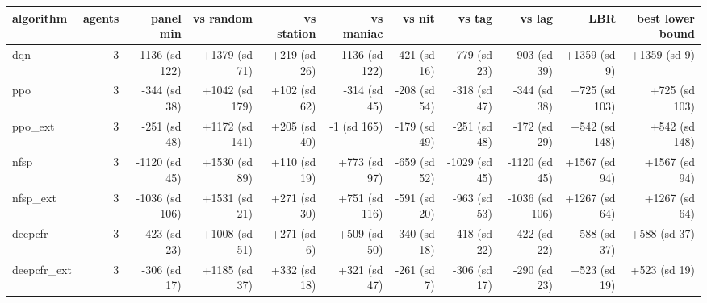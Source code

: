 \begin{tabular}{lrrrrrrrrrr}
\toprule
algorithm & agents & panel min & vs random & vs station & vs maniac & vs nit & vs tag & vs lag & LBR & best lower bound \\
\midrule
dqn & 3 & -1136 (sd 122) & +1379 (sd 71) & +219 (sd 26) & -1136 (sd 122) & -421 (sd 16) & -779 (sd 23) & -903 (sd 39) & +1359 (sd 9) & +1359 (sd 9) \\
ppo & 3 & -344 (sd 38) & +1042 (sd 179) & +102 (sd 62) & -314 (sd 45) & -208 (sd 54) & -318 (sd 47) & -344 (sd 38) & +725 (sd 103) & +725 (sd 103) \\
ppo\_ext & 3 & -251 (sd 48) & +1172 (sd 141) & +205 (sd 40) & -1 (sd 165) & -179 (sd 49) & -251 (sd 48) & -172 (sd 29) & +542 (sd 148) & +542 (sd 148) \\
nfsp & 3 & -1120 (sd 45) & +1530 (sd 89) & +110 (sd 19) & +773 (sd 97) & -659 (sd 52) & -1029 (sd 45) & -1120 (sd 45) & +1567 (sd 94) & +1567 (sd 94) \\
nfsp\_ext & 3 & -1036 (sd 106) & +1531 (sd 21) & +271 (sd 30) & +751 (sd 116) & -591 (sd 20) & -963 (sd 53) & -1036 (sd 106) & +1267 (sd 64) & +1267 (sd 64) \\
deepcfr & 3 & -423 (sd 23) & +1008 (sd 51) & +271 (sd 6) & +509 (sd 50) & -340 (sd 18) & -418 (sd 22) & -422 (sd 22) & +588 (sd 37) & +588 (sd 37) \\
deepcfr\_ext & 3 & -306 (sd 17) & +1185 (sd 37) & +332 (sd 18) & +321 (sd 47) & -261 (sd 7) & -306 (sd 17) & -290 (sd 23) & +523 (sd 19) & +523 (sd 19) \\
\bottomrule
\end{tabular}
